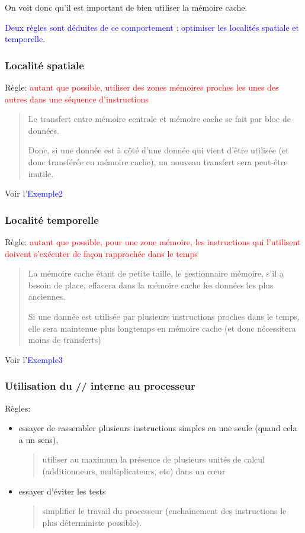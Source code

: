 \documentclass{beamer}
\begin{document}
\begin{frame}
\vfill
On voit donc qu'il est important de bien utiliser la mémoire cache.

\vfill
   \textcolor{blue}{Deux règles sont déduites de ce comportement : optimiser les localités spatiale et temporelle.}
\vfill 
\end{frame}

\begin{frame}
\frametitle{Localit\'e spatiale}
Règle:  \textcolor{red}{autant que possible, utiliser des zones m\'emoires proches les unes des autres dans une s\'equence d'instructions}
	\vfill
\begin{quote}
	Le transfert entre m\'emoire centrale et m\'emoire cache se fait par bloc de donn\'ees.
	
	Donc, si une donn\'ee est \`a c\^ot\'e d'une donn\'ee qui vient d'\^etre utilis\'ee (et donc transf\'er\'ee en m\'emoire cache), un nouveau transfert sera peut-\^etre inutile.
\end{quote}

\vfill
Voir l'\textcolor{blue}{Exemple2}
\end{frame}

\begin{frame}
\frametitle{Localit\'e temporelle}
Règle: 
	\textcolor{red}{autant que possible, pour une zone m\'emoire, les instructions qui l'utilisent doivent s'ex\'ecuter de façon rapproch\'ee dans le temps}
	\vfill
	
	\begin{quote}
		La m\'emoire cache \'etant de petite taille, le gestionnaire m\'emoire, s'il a besoin de place, effacera dans la m\'emoire cache les donn\'ees les plus anciennes.
		
		Si une donn\'ee est utilis\'ee par plusieurs instructions proches dans le temps, elle sera maintenue plus longtemps en m\'e\-moi\-re cache (et donc n\'ecessitera moins de transferts)
	\end{quote}

\vfill
Voir l'\textcolor{blue}{Exemple3}
\end{frame}

\begin{frame}[fragile]
\frametitle{Utilisation du // interne au processeur}
Règles: 
\begin{itemize}
	\item essayer de rassembler plusieurs instructions simples en une seule (quand cela a un sens),
	\begin{quote}
		utiliser au maximum la pr\'esence de plusieurs unit\'es de calcul (additionneurs, multiplicateurs, etc) dans un c\oe ur
	\end{quote}
	\item  essayer d'\'eviter les tests
	\begin{quote}
		simplifier le travail du processeur (encha\^{i}nement des instructions le plus d\'eterministe possible).
	\end{quote}
\end{itemize}


\end{frame}
\end{document}
